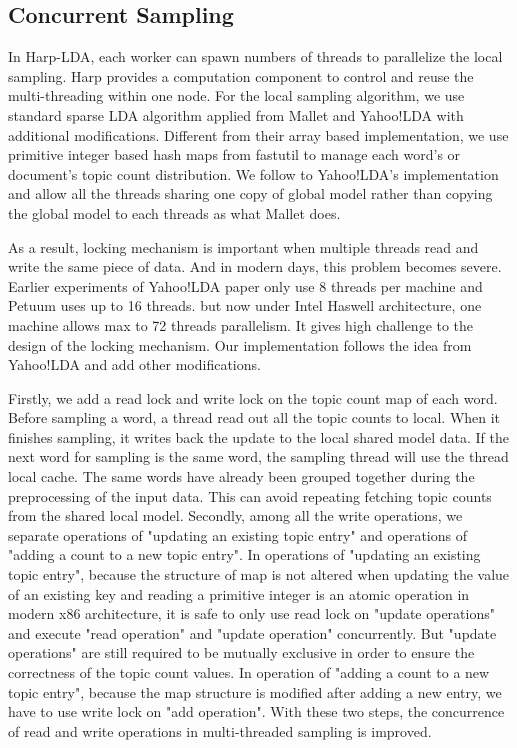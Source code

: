 \documentclass[conference]{IEEEtran}
\begin{document}
\subsection{Concurrent Sampling}
In Harp-LDA, each worker can spawn numbers of threads to parallelize the local sampling.
Harp provides a computation component to control and reuse the multi-threading within one node.
For the local sampling algorithm, we use standard sparse LDA algorithm applied from
Mallet and Yahoo!LDA with additional modifications.
Different from their array based implementation, we use primitive integer
based hash maps from fastutil \cite{27} to manage each word's or document's topic count distribution.
We follow to Yahoo!LDA's implementation and allow all the threads sharing one copy of global model
rather than copying the global model to each threads as what Mallet does.

As a result, locking mechanism is important when multiple threads read and write the same piece of data.
And in modern days, this problem becomes severe.
Earlier experiments of Yahoo!LDA paper only use 8 threads per machine and Petuum uses up to 16 threads.
but now under Intel Haswell architecture, one machine allows max to 72 threads parallelism.
It gives high challenge to the design of the locking mechanism.
Our implementation follows the idea from Yahoo!LDA and add other modifications.

Firstly, we add a read lock and write lock on the topic count map of each word.
Before sampling a word, a thread read out all the topic counts to local.
When it finishes sampling, it writes back the update to the local shared model data.
If the next word for sampling is the same word,
the sampling thread will use the thread local cache. 
The same words have already been grouped together during the preprocessing of the input data.
This can avoid repeating fetching topic counts from the shared local model.
Secondly, among all the write operations, 
we separate operations of "updating an existing topic entry" 
and operations of "adding a count to a new topic entry".
In operations of "updating an existing topic entry",
because the structure of map is not altered when updating the value of an existing key 
and reading a primitive integer is an atomic operation in modern x86 architecture,
it is safe to only use read lock on "update operations" 
and execute "read operation" and "update operation" concurrently. 
But "update operations" are still required to be mutually exclusive 
in order to ensure the correctness of the topic count values. 
In operation of "adding a count to a new topic entry", 
because the map structure is modified after adding a new entry,
we have to use write lock on "add operation".
With these two steps,
the concurrence of read and write operations in multi-threaded sampling is improved.
%
%
\end{document}
